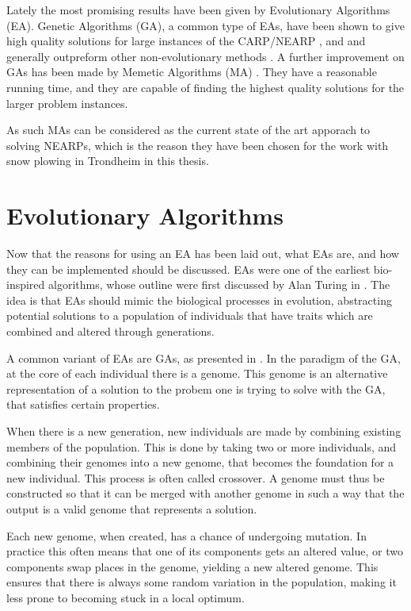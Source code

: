 Lately the most promising results have been given by Evolutionary Algorithms (EA). Genetic Algorithms (GA), a common type of EAs, have been shown to give high quality solutions for large instances of the CARP/NEARP \citep{lacomme2001GA}, and and generally outpreform other non-evolutionary methods \citep{wohlk2008decade}. A further improvement on GAs has been made by Memetic Algorithms (MA) \citep{prins2005memetic}. They have a reasonable running time, and they are capable of finding the highest quality solutions for the larger problem instances.

As such MAs can be considered as the current state of the art apporach to solving NEARPs, which is the reason they have been chosen for the work with snow plowing in Trondheim in this thesis.



\section{Evolutionary Algorithms} %
\label{sec:evolutionary_algorithms}
Now that the reasons for using an EA has been laid out, what EAs are, and how they can be implemented should be discussed. EAs were one of the earliest bio-inspired algorithms, whose outline were first discussed by Alan Turing in \citet{turing1950computing}. The idea is that EAs should mimic the biological processes in evolution, abstracting potential solutions to a population of individuals that have traits which are combined and altered through generations.

A common variant of EAs are GAs, as presented in \citet{holland1975originalGA}. In the paradigm of the GA, at the core of each individual there is a genome. This genome is an alternative representation of a solution to the probem one is trying to solve with the GA, that satisfies certain properties.

When there is a new generation, new individuals are made by combining existing members of the population. This is done by taking two or more individuals, and combining their genomes into a new genome, that becomes the foundation for a new individual. This process is often called crossover. A genome must thus be constructed so that it can be merged with another genome in such a way that the output is a valid genome that represents a solution.

Each new genome, when created, has a chance of undergoing mutation. In practice this often means that one of its components gets an altered value, or two components swap places in the genome, yielding a new altered genome. This ensures that there is always some random variation in the population, making it less prone to becoming stuck in a local optimum.

